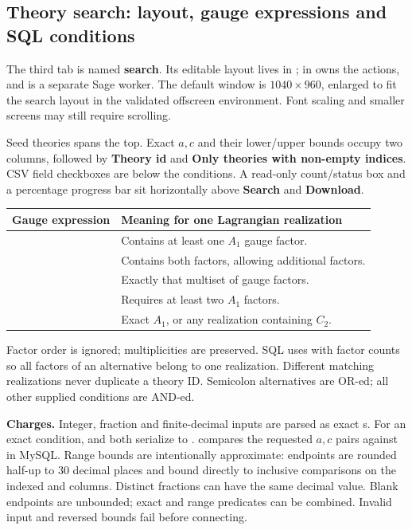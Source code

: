 \clearpage
\subsection{Theory search: layout, gauge expressions and SQL conditions}
\label{sec:theory-search}
The third tab is named \textbf{search}. Its editable layout lives in
;  in 
owns the actions, and  is a separate Sage worker.
The default window is $1040\times960$, enlarged to fit the search layout in
the validated offscreen environment. Font scaling and smaller screens may
still require scrolling.

Seed theories spans the top. Exact $a,c$ and their lower/upper bounds occupy
two columns, followed by \textbf{Theory id} and
\textbf{Only theories with non-empty indices}. CSV field checkboxes are below
the conditions. A read-only count/status box and a percentage progress bar
sit horizontally above \textbf{Search} and \textbf{Download}.

\begin{tabularx}{\textwidth}{@{}p{37mm}Y@{}}
\toprule Gauge expression & Meaning for one Lagrangian realization\\\midrule
{} & Contains at least one $A_1$ gauge factor.\\
 & Contains both factors, allowing additional factors.\\
 & Exactly that multiset of gauge factors.\\
 & Requires at least two $A_1$ factors.\\
 & Exact $A_1$, or any realization containing $C_2$.\\\bottomrule
\end{tabularx}
Factor order is ignored; multiplicities are preserved. SQL uses 
with factor counts so all factors of an alternative belong to one realization.
Different matching realizations never duplicate a theory ID. Semicolon
alternatives are OR-ed; all other supplied conditions are AND-ed.

\textbf{Charges.} Integer, fraction and finite-decimal inputs are parsed as
exact s. For an exact condition,  and 
both serialize to .
 compares the requested $a,c$ pairs against
 in MySQL. Range bounds are intentionally
approximate: endpoints are rounded half-up to 30 decimal places and bound
directly to inclusive comparisons on the indexed
 and  columns.
Distinct fractions can have the same decimal value. Blank endpoints are
unbounded; exact and range predicates can be combined. Invalid input and
reversed bounds fail before connecting.

